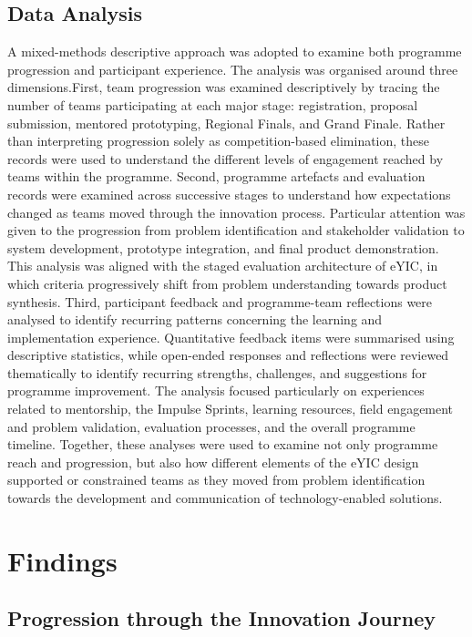 \documentclass[runningheads]{llncs}
\begin{document}
\subsection{Data Analysis}

A mixed-methods descriptive approach was adopted to examine both programme progression and participant experience. The analysis was organised around three dimensions.First, team progression was examined descriptively by tracing the number of teams participating at each major stage: registration, proposal submission, mentored prototyping, Regional Finals, and Grand Finale. Rather than interpreting progression solely as competition-based elimination, these records were used to understand the different levels of engagement reached by teams within the programme. Second, programme artefacts and evaluation records were examined across successive stages to understand how expectations changed as teams moved through the innovation process. Particular attention was given to the progression from problem identification and stakeholder validation to system development, prototype integration, and final product demonstration. This analysis was aligned with the staged evaluation architecture of eYIC, in which criteria progressively shift from problem understanding towards product synthesis. Third, participant feedback and programme-team reflections were analysed to identify recurring patterns concerning the learning and implementation experience. Quantitative feedback items were summarised using descriptive statistics, while open-ended responses and reflections were reviewed thematically to identify recurring strengths, challenges, and suggestions for programme improvement. The analysis focused particularly on experiences related to mentorship, the Impulse Sprints, learning resources, field engagement and problem validation, evaluation processes, and the overall programme timeline. Together, these analyses were used to examine not only programme reach and progression, but also how different elements of the eYIC design supported or constrained teams as they moved from problem identification towards the development and communication of technology-enabled solutions.

\section{Findings}

\subsection{Progression through the Innovation Journey}
\end{document}
